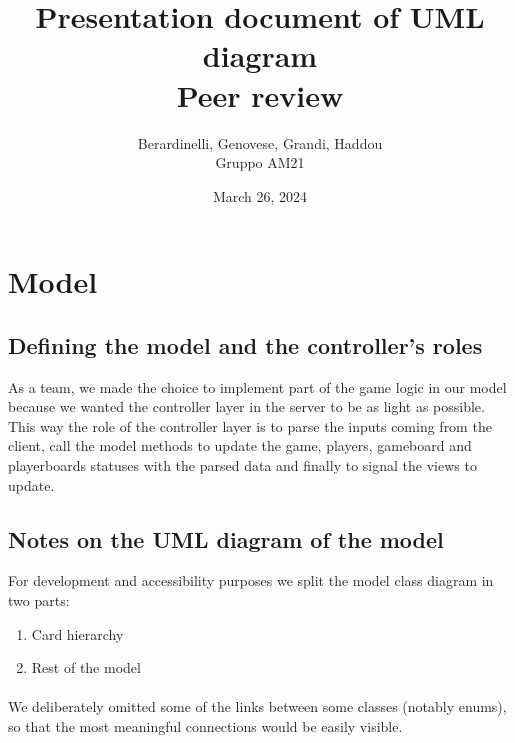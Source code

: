 \documentclass[12pt]{article}
\title{Presentation document of UML diagram\\Peer review}
\author{Berardinelli, Genovese, Grandi, Haddou\\Gruppo AM21}
\date{March 26, 2024}
\begin{document}
\maketitle
\section{Model}
\subsection{Defining the model and the controller's roles}
As a team, we made the choice to implement part of the game logic in our model because we wanted the controller layer in the server to be as light as possible. This way the role of the controller layer is to parse the inputs coming from the client, call the model methods to update the game, players, gameboard and playerboards statuses with the parsed data and finally to signal the views to update. 

\subsection{Notes on the UML diagram of the model}
For development and accessibility purposes we split the model class diagram in two parts: 
\begin{enumerate}
\item Card hierarchy 
\item Rest of the model 
\end{enumerate}

\paragraph{}
We deliberately omitted some of the links between some classes (notably enums), so that the most meaningful connections would be easily visible.
\paragraph{}


\newpage
\end{document}
